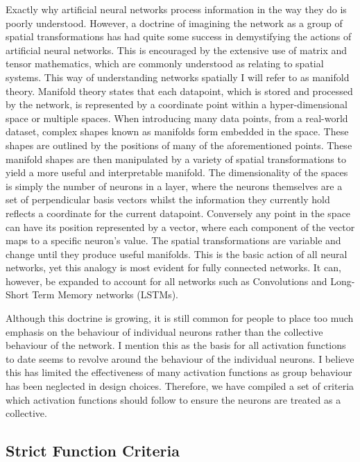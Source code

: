 \documentclass[onecolumn]{article}
\begin{document}
    Exactly why artificial neural networks process information in the way they do is poorly understood. However, a doctrine of imagining the network as a group of spatial transformations has had quite some success in demystifying the actions of artificial neural networks. This is encouraged by the extensive use of matrix and tensor mathematics, which are commonly understood as relating to spatial systems. This way of understanding networks spatially I will refer to as manifold theory. Manifold theory states that each datapoint, which is stored and processed by the network, is represented by a coordinate point within a hyper-dimensional space or multiple spaces. When introducing many data points, from a real-world dataset, complex shapes known as manifolds form embedded in the space. These shapes are outlined by the positions of many of the aforementioned points. These manifold shapes are then manipulated by a variety of spatial transformations to yield a more useful and interpretable manifold. The dimensionality of the spaces is simply the number of neurons in a layer, where the neurons themselves are a set of perpendicular basis vectors whilst the information they currently hold reflects a coordinate for the current datapoint. Conversely any point in the space can have its position represented by a vector, where each component of the vector maps to a specific neuron's value. The spatial transformations are variable and change until they produce useful manifolds. This is the basic action of all neural networks, yet this analogy is most evident for fully connected networks. It can, however, be expanded to account for all networks such as Convolutions and Long-Short Term Memory networks (LSTMs).

        
    Although this doctrine is growing, it is still common for people to place too much emphasis on the behaviour of individual neurons rather than the collective behaviour of the network. I mention this as the basis for all activation functions to date seems to revolve around the behaviour of the individual neurons. I believe this has limited the effectiveness of many activation functions as group behaviour has been neglected in design choices. Therefore, we have compiled a set of criteria which activation functions should follow to ensure the neurons are treated as a collective.
    
    \subsection{Strict Function Criteria}
    
\end{document}

